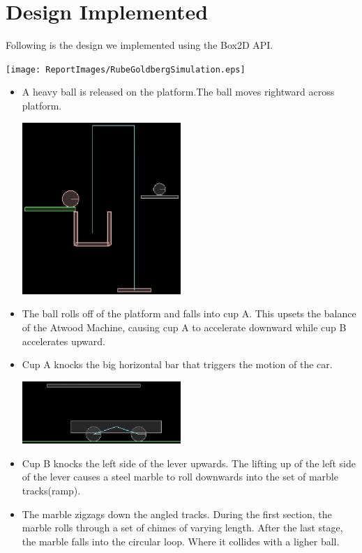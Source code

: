 \documentclass[11pt, a4paper]{article}
\begin{document}
\section{Design Implemented}

Following is the design we implemented using the Box2D API. 

\begin{center}
\texttt{[image: ReportImages/RubeGoldbergSimulation.eps]}
\end{center} 

\begin{itemize}
\item A heavy ball is released on the platform.The ball moves rightward across platform.

\begin{center}
\includegraphics[width = 6cm]{ReportImages/init.eps}
\end{center} 

\item The ball rolls off of the platform and falls into cup A. This upsets the balance of the Atwood Machine,
causing cup A to accelerate downward while cup B accelerates upward.
\item Cup A knocks the big horizontal bar that triggers the motion of the car.

\begin{center}
\includegraphics[width = 6cm]{ReportImages/car.eps}
\end{center} 


\item Cup B knocks the left side of the lever upwards. The lifting up of the left side of the lever causes a steel
marble to roll downwards into the set of marble tracks(ramp).
\item The marble zigzags down the angled tracks. During the first section, the marble rolls through a set of
chimes of varying length. After the last stage, the marble falls into the circular loop. Where it collides with a ligher ball.


\end{itemize}
\end{document}
